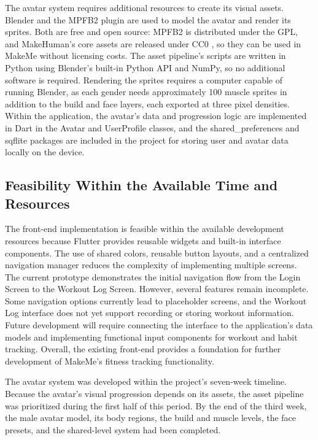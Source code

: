 \documentclass[11pt]{article}
\begin{document}
The avatar system requires additional resources to create its visual assets. Blender \cite{blender} and the MPFB2 plugin \cite{mpfb2} are used to model the avatar and render its sprites. Both are free and open source: MPFB2 is distributed under the GPL, and MakeHuman's core assets are released under CC0 \cite{makehumanlicense}, so they can be used in MakeMe without licensing costs. The asset pipeline's scripts are written in Python using Blender's built-in Python API and NumPy, so no additional software is required. Rendering the sprites requires a computer capable of running Blender, as each gender needs approximately 100 muscle sprites in addition to the build and face layers, each exported at three pixel densities. Within the application, the avatar's data and progression logic are implemented in Dart in the Avatar and UserProfile classes, and the shared\_preferences and sqflite packages are included in the project for storing user and avatar data locally on the device.

\subsection{Feasibility Within the Available
Time and Resources}

The front-end implementation is feasible within the available development resources because Flutter provides reusable widgets and built-in interface components. The use of shared colors, reusable button layouts, and a centralized navigation manager reduces the complexity of implementing multiple screens. The current prototype demonstrates the initial navigation flow from the Login Screen to the Workout Log Screen.
However, several features remain incomplete. Some navigation options currently lead to placeholder screens, and the Workout Log interface does not yet support recording or storing workout information. Future development will require connecting the interface to the application's data models and implementing functional input components for workout and habit tracking.
Overall, the existing front-end provides a foundation for further development of MakeMe's fitness tracking functionality.

The avatar system was developed within the project's seven-week timeline. Because the avatar's visual progression depends on its assets, the asset pipeline was prioritized during the first half of this period. By the end of the third week, the male avatar model, its body regions, the build and muscle levels, the face presets, and the shared-level system had been completed.
\end{document}
